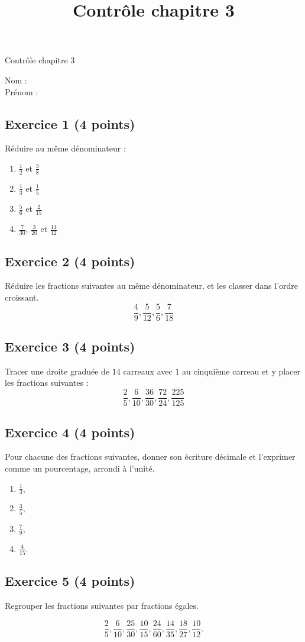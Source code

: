 \documentclass[14 pt]{extarticle}
\title{Contrôle chapitre 3}
\date{}
\theoremstyle{plain}
\begin{document}
\begin{center}{\Large Contrôle chapitre 3}\\ 
 \end{center}
 Nom : \\
 Prénom : 
 \subsection*{Exercice 1 (4 points)}
 Réduire au même dénominateur : 
 
 \begin{enumerate}
 \item $\frac12$ et $\frac38$
 \item $\frac13$ et $\frac15$
 \item $\frac56$ et $\frac2{15}$
 \item $\frac7{30}$, $\frac3{20}$ et $\frac{11}{12}$
 \end{enumerate}

\subsection*{Exercice 2 (4 points)}
Réduire les fractions suivantes au même dénominateur, et les classer dans l'ordre croissant. 
\[ \frac49, \frac5{12}, \frac56, \frac7{18}\]
\subsection*{Exercice 3 (4 points)}

Tracer une droite graduée de $14$ carreaux avec $1$ au cinquième carreau et y placer les fractions suivantes : 
\[ \frac25, \frac6{10}, \frac{36}{30}, \frac{72}{24}, \frac{225}{125}\]

\subsection*{Exercice 4 (4 points)}

Pour chacune des fractions suivantes, donner son écriture décimale et l'exprimer comme un pourcentage, arrondi à l'unité. 
\begin{enumerate}
\item $\frac13$,
\item $\frac35$,
\item $\frac79$,
\item $\frac{4}{15}$. 
\end{enumerate}

\subsection*{Exercice 5 (4 points)}
Regrouper les fractions suivantes par fractions égales. 

\[\frac25, \frac6{10}, \frac{25}{30},\frac{10}{15},
\frac{24}{60},\frac{14}{35}, \frac{18}{27},
\frac{10}{12}.
 \]

 	
\end{document}
